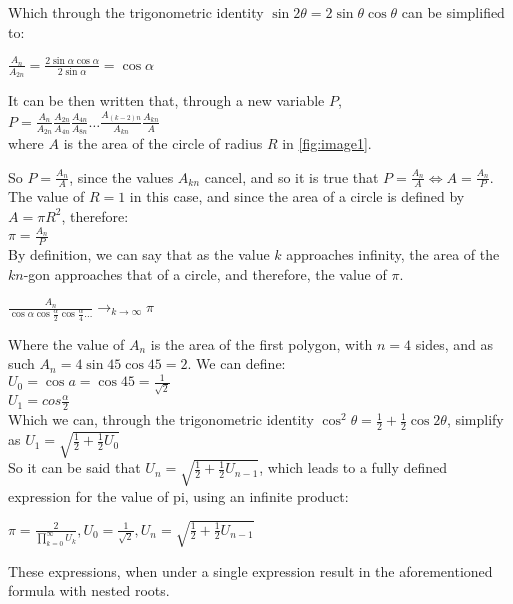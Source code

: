 Which through the trigonometric identity $\sin{2 \theta} = 2\sin{\theta} \cos{\theta}$ can 
be simplified to:

$\frac{A_{n}}{A_{2n}} = \frac{2\sin{\alpha} \cos{\alpha} }{2\sin{\alpha}}  = \cos{\alpha}$

It can be then written that, through a new variable $P$, \\
$P = \frac{A_{n}}{A_{2n}} \frac{A_{2n}}{A_{4n}} \frac{A_{4n}}{A_{8n}} \dots \frac{A_{(k-2)n}}{A_{kn}} \frac{A_{kn}}{A}$ \\
where $A$ is the area of the circle of radius $R$ 
in \ref{fig:image1}. 

So $P = \frac{A_{n}}{A}$, since the values $A_{kn}$ cancel, and 
so it is true that $P = \frac{A_{n}}{A} \Leftrightarrow A = \frac{A_{n}}{P}$. The 
value of $R = 1$ in this case, and since the area of a circle is defined 
by $A = \pi R^2$, therefore: \\
$\pi = \frac{A_{n}}{P}$ \\
By definition, we can say that as the value $k$ approaches infinity, the area of the $kn$-gon 
approaches that of a circle, and therefore, the value of $\pi$.

$\frac{A_{n}}{\cos{\alpha} \cos{\frac{\alpha}{2}} \cos{\frac{\alpha}{4}} \dots}
\to_{k \to \infty} \pi$

Where the value of $A_{n}$ is the area of the first polygon, with $n=4$ sides, and as such 
$A_{n} = 4 \sin{45} \cos{45} = 2$. We can define: \\
$U_{0} = \cos{a} = \cos{45} = \frac{1}{\sqrt{2}}$ \\
$U_{1} = cos{\frac{\alpha}{2}}$ \\
Which we can, through the trigonometric identity 
$\cos^2{\theta} = \frac{1}{2} + \frac{1}{2} \cos{2\theta}$, simplify as
$U_{1} = \sqrt{\frac{1}{2} + \frac{1}{2} U_{0}}$ \\
So it can be said that $U_{n} = \sqrt{\frac{1}{2} + \frac{1}{2} U_{n - 1}}$, which leads to 
a fully defined expression for the value of pi, using an infinite product: 

$\pi = \frac{2}{\prod\limits_{k=0}^\infty U_{k}}, U_{0} = \frac{1}{\sqrt{2}}, U_{n} = \sqrt{\frac{1}{2} + \frac{1}{2} U_{n - 1}}$ \footnotemark

These expressions, when under a single expression result in the aforementioned 
formula with nested roots.  




